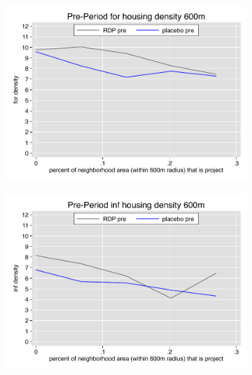 \documentclass[12pt]{article}
\begin{document}
\begin{figure}
        \begin{subfigure}[b]{0.495\textwidth}
            \centering
            \includegraphics[width=\textwidth,trim={0.3cm .3cm 0.1cm 0cm}, clip=true]{figures/overlap_for_600_total_pre.pdf}
        \end{subfigure}
        \hfill
        \begin{subfigure}[b]{0.495\textwidth}  
            \centering 
            \includegraphics[width=\textwidth,trim={0.3cm .3cm 0.1cm 0cm}, clip=true]{figures/overlap_inf_600_total_pre.pdf}
        \end{subfigure}
        \vspace{-6mm}

\end{figure}
\end{document}
